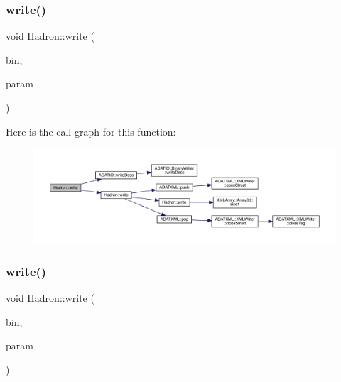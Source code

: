 \subsubsection{\texorpdfstring{write()}{write()}\hspace{0.1cm}{\footnotesize\ttfamily [78/95]}}
{\footnotesize\ttfamily void Hadron\+::write (\begin{DoxyParamCaption}\item[{\mbox{\hyperlink{classADATIO_1_1BinaryWriter}{Binary\+Writer}} \&}]{bin,  }\item[{const \mbox{\hyperlink{structHadron_1_1KeyHadronSUNNPartIrrepOp__t_1_1CGPair__t_1_1Slot__t}{Key\+Hadron\+S\+U\+N\+N\+Part\+Irrep\+Op\+\_\+t\+::\+C\+G\+Pair\+\_\+t\+::\+Slot\+\_\+t}} \&}]{param }\end{DoxyParamCaption})}

Here is the call graph for this function\+:\nopagebreak
\begin{figure}[H]
\begin{center}
\leavevmode
\includegraphics[width=350pt]{d1/daf/namespaceHadron_ad5c8dc860360f98655b29f17b61f2a35_cgraph}
\end{center}
\end{figure}
\mbox{\label{namespaceHadron_a4beaf6ce4a67fc85ae046f257141250e}} 
\subsubsection{\texorpdfstring{write()}{write()}\hspace{0.1cm}{\footnotesize\ttfamily [79/95]}}
{\footnotesize\ttfamily void Hadron\+::write (\begin{DoxyParamCaption}\item[{\mbox{\hyperlink{classADATIO_1_1BinaryWriter}{Binary\+Writer}} \&}]{bin,  }\item[{const \mbox{\hyperlink{structHadron_1_1KeyHadronNPartIrrepOp__t_1_1CGPair__t_1_1Slot__t}{Key\+Hadron\+N\+Part\+Irrep\+Op\+\_\+t\+::\+C\+G\+Pair\+\_\+t\+::\+Slot\+\_\+t}} \&}]{param }\end{DoxyParamCaption})}

